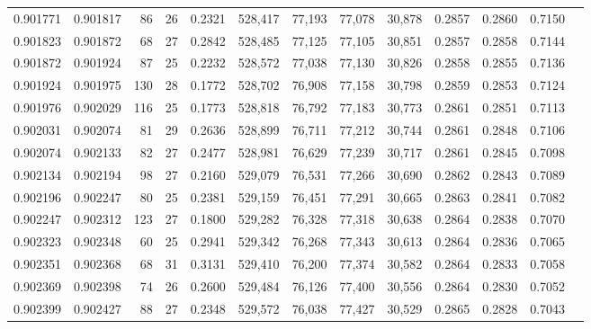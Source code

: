\begin{tabular}{rrrrrrrrrrrrr}
0.901771 & 0.901817 &    86 &  26 &                                     0.2321 & 528,417 &  77,193 &  77,078 &  30,878 & 0.2857 & 0.2860 & 0.7150 \\
0.901823 & 0.901872 &    68 &  27 &                                     0.2842 & 528,485 &  77,125 &  77,105 &  30,851 & 0.2857 & 0.2858 & 0.7144 \\
0.901872 & 0.901924 &    87 &  25 &                                     0.2232 & 528,572 &  77,038 &  77,130 &  30,826 & 0.2858 & 0.2855 & 0.7136 \\
0.901924 & 0.901975 &   130 &  28 &                                     0.1772 & 528,702 &  76,908 &  77,158 &  30,798 & 0.2859 & 0.2853 & 0.7124 \\
0.901976 & 0.902029 &   116 &  25 &                                     0.1773 & 528,818 &  76,792 &  77,183 &  30,773 & 0.2861 & 0.2851 & 0.7113 \\
0.902031 & 0.902074 &    81 &  29 &                                     0.2636 & 528,899 &  76,711 &  77,212 &  30,744 & 0.2861 & 0.2848 & 0.7106 \\
0.902074 & 0.902133 &    82 &  27 &                                     0.2477 & 528,981 &  76,629 &  77,239 &  30,717 & 0.2861 & 0.2845 & 0.7098 \\
0.902134 & 0.902194 &    98 &  27 &                                     0.2160 & 529,079 &  76,531 &  77,266 &  30,690 & 0.2862 & 0.2843 & 0.7089 \\
0.902196 & 0.902247 &    80 &  25 &                                     0.2381 & 529,159 &  76,451 &  77,291 &  30,665 & 0.2863 & 0.2841 & 0.7082 \\
0.902247 & 0.902312 &   123 &  27 &                                     0.1800 & 529,282 &  76,328 &  77,318 &  30,638 & 0.2864 & 0.2838 & 0.7070 \\
0.902323 & 0.902348 &    60 &  25 &                                     0.2941 & 529,342 &  76,268 &  77,343 &  30,613 & 0.2864 & 0.2836 & 0.7065 \\
0.902351 & 0.902368 &    68 &  31 &                                     0.3131 & 529,410 &  76,200 &  77,374 &  30,582 & 0.2864 & 0.2833 & 0.7058 \\
0.902369 & 0.902398 &    74 &  26 &                                     0.2600 & 529,484 &  76,126 &  77,400 &  30,556 & 0.2864 & 0.2830 & 0.7052 \\
0.902399 & 0.902427 &    88 &  27 &                                     0.2348 & 529,572 &  76,038 &  77,427 &  30,529 & 0.2865 & 0.2828 & 0.7043 \\

\end{tabular}

